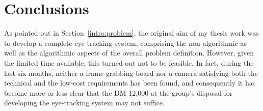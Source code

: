 
\cleardoublepage
\chapter{Conclusions}
\label{concl}

As pointed out in Section~\ref{intro:problem}, the original aim of my
thesis work was to develop a complete eye-tracking system, comprising
the non-algorithmic as well as the algorithmic aspects of the overall
problem definition.  However, given the limited time available, this
turned out not to be feasible.  In fact, during the last six months,
neither a frame-grabbing board nor a camera satisfying both the
technical and the low-cost requirements has been found, and
consequently it has become more or less clear that the DM 12,000 at
the group's disposal for developing the eye-tracking system may not
suffice.



